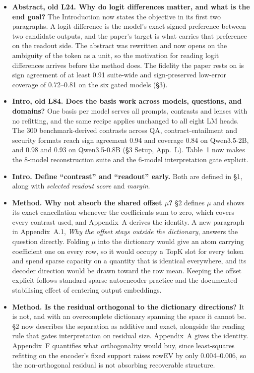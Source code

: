 \documentclass[11pt]{article}
\begin{document}
\begin{itemize}
\item \textbf{Abstract, old L24. Why do logit differences matter, and what is
the end goal?} The Introduction now states the objective in its first two
paragraphs. A logit difference is the model's exact signed
preference between two candidate outputs, and the paper's target is what
carries that preference on the readout side. The abstract was rewritten and
now opens on the ambiguity of the token as a unit, so the motivation for
reading logit differences arrives before the method does. The fidelity the
paper rests on is sign agreement of at least 0.91 suite-wide and
sign-preserved low-error coverage of 0.72--0.81 on the six gated models
(\S3).

\item \textbf{Intro, old L84. Does the basis work across models, questions,
and domains?} One basis per model serves all prompts, contrasts and lenses
with no refitting, and the same recipe applies unchanged to all eight LM
heads. The 300 benchmark-derived contrasts across QA, contract-entailment and
security formats reach sign agreement 0.94 and coverage 0.84 on Qwen3.5-2B,
and 0.98 and 0.93 on Qwen3.5-0.8B (\S3 Setup, App.~L). Table~1 now
makes the 8-model reconstruction suite and the 6-model interpretation gate
explicit.

\item \textbf{Intro. Define ``contrast'' and ``readout'' early.} Both are
defined in \S1, along with \emph{selected readout score} and
\emph{margin}.

\item \textbf{Method. Why not absorb the shared offset $\mu$?} \S2 defines $\mu$ and shows its exact cancellation whenever the
coefficients sum to zero, which covers every contrast used, and Appendix~A
derives the identity. A new paragraph in Appendix~A.1, \emph{Why the offset
stays outside the dictionary}, answers the question directly.
Folding $\mu$ into the dictionary would give an atom carrying coefficient one
on every row, so it would occupy a TopK slot for every token and spend sparse
capacity on a quantity that is identical everywhere, and its decoder
direction would be drawn toward the row mean. Keeping the offset explicit
follows standard sparse autoencoder practice and the documented stabilising
effect of centering output embeddings.

\item \textbf{Method. Is the residual orthogonal to the dictionary
directions?} It is not, and with an overcomplete dictionary spanning the
space it cannot be. \S2 now describes the separation as additive
and exact, alongside the reading rule that gates interpretation on residual
size. Appendix~A gives the identity. Appendix~F quantifies what orthogonality
would buy, since least-squares refitting on the encoder's fixed support
raises rowEV by only 0.004--0.006, so the non-orthogonal residual is not
absorbing recoverable structure.


\end{itemize}
\end{document}
